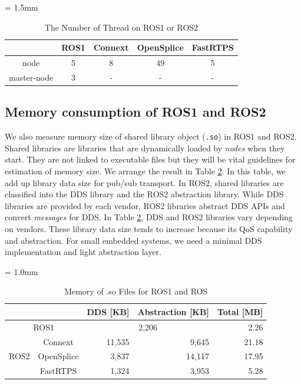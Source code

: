\documentclass{sig-alternate-05-2015}
\begin{document}
\begin{table}[t]
  \caption{\label{tb:thread}The Number of Thread on ROS1 or ROS2}
  \centering
  \tabcolsep = 1.5mm              %
  \begin{tabular}{c|cccc}
    \hline
    & ROS1 & Connext & OpenSplice & FastRTPS \\
    \hline
    \hline
    node & 5 & 8 & 49 & 5 \\
    master-node & 3 & - & - & - \\
    \hline
  \end{tabular}
  \vspace{-5mm}
\end{table}

\vspace{-1mm}
\subsection{Memory consumption of ROS1 and ROS2}
\label{sec:throughput}
We also measure memory size of shared library object (\texttt{.so}) in ROS1 and ROS2.
Shared libraries are libraries that are dynamically loaded by \emph{nodes} when they start.
They are not linked to executable files but they will be vital guidelines for estimation of memory size.
We arrange the result in Table \ref{tb:memory}.
In this table, we add up library data size for pub/sub transport.
In ROS2, shared libraries are classified into the DDS library and the ROS2 abstraction library.
While DDS libraries are provided by each vendor, ROS2 libraries abstract DDS APIs and convert \emph{messages} for DDS.
In Table \ref{tb:memory}, DDS and ROS2 libraries vary depending on vendors.
These library data size tends to increase because its QoS capability and abstraction.
For small embedded systems, we need a minimal DDS implementation and light abstraction layer.

\begin{table}[t]
  \caption{Memory of .so Files for ROS1 and ROS}
  \centering
  \renewcommand{\arraystretch}{1.15}
  \label{tb:memory}
  \small
  \tabcolsep = 1.0mm              %
  \begin{tabular}{c|c||r|r||r}
    \hline
    \multicolumn{2}{c||}{} & DDS [KB] & Abstraction [KB] & Total [MB] \\ \hline \hline
    \multicolumn{2}{c||}{ROS1}  & \multicolumn{2}{c||}{ 2,206 } & 2.26 \\ \hline
    \multirow{3}{*}{ROS2} & Connext & 11,535 & 9,645 & 21.18 \\ 
    & OpenSplice & 3,837 & 14,117 & 17.95 \\ 
    & FastRTPS & 1,324 & 3,953 & 5.28\\ \hline
  \end{tabular}
  \vspace{-5mm}
\end{table}
\end{document}
